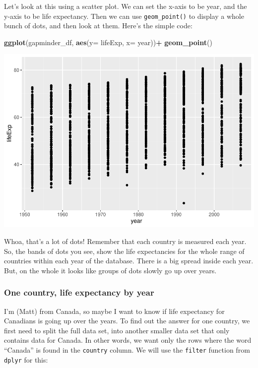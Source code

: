 \documentclass[
]{book}
\newenvironment{Shaded}{\begin{snugshade}}{\end{snugshade}}
\newcommand{\AttributeTok}[1]{\textcolor[rgb]{0.13,0.29,0.53}{#1}}
\newcommand{\FunctionTok}[1]{\textcolor[rgb]{0.13,0.29,0.53}{\textbf{#1}}}
\newcommand{\NormalTok}[1]{#1}
\newcommand{\SpecialCharTok}[1]{\textcolor[rgb]{0.81,0.36,0.00}{\textbf{#1}}}
\begin{document}
Let's look at this using a scatter plot. We can set the x-axis to be year, and the y-axis to be life expectancy. Then we can use \texttt{geom\_point()} to display a whole bunch of dots, and then look at them. Here's the simple code:

\begin{Shaded}
\begin{Highlighting}[]
\FunctionTok{ggplot}\NormalTok{(gapminder\_df, }\FunctionTok{aes}\NormalTok{(}\AttributeTok{y=}\NormalTok{ lifeExp, }\AttributeTok{x=}\NormalTok{ year))}\SpecialCharTok{+}
  \FunctionTok{geom\_point}\NormalTok{()}
\end{Highlighting}
\end{Shaded}

\includegraphics{Statistics_Lab_files/figure-latex/1scatterplot-1.pdf}

Whoa, that's a lot of dots! Remember that each country is measured each year. So, the bands of dots you see, show the life expectancies for the whole range of countries within each year of the database. There is a big spread inside each year. But, on the whole it looks like groups of dots slowly go up over years.

\hypertarget{one-country-life-expectancy-by-year}{%
\subsubsection{One country, life expectancy by year}\label{one-country-life-expectancy-by-year}}

I'm (Matt) from Canada, so maybe I want to know if life expectancy for Canadians is going up over the years. To find out the answer for one country, we first need to split the full data set, into another smaller data set that only contains data for Canada. In other words, we want only the rows where the word ``Canada'' is found in the \texttt{country} column. We will use the \texttt{filter} function from \texttt{dplyr} for this:
\end{document}
